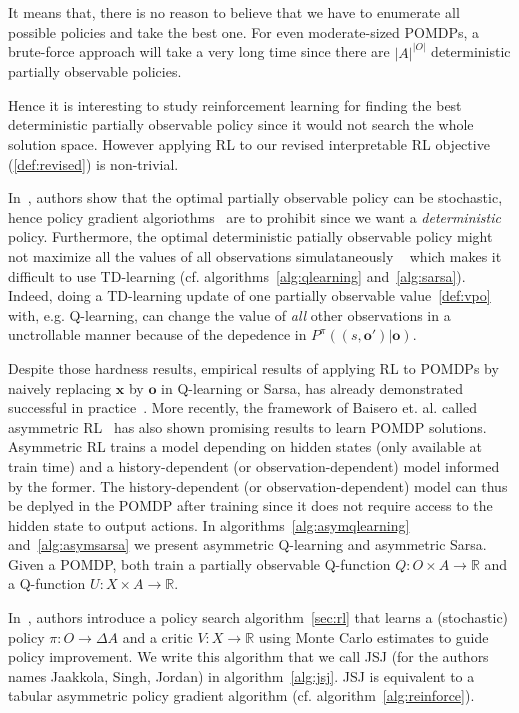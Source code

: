 It means that, there is no reason to believe that we have to enumerate all possible policies and take the best one. 
For even moderate-sized POMDPs, a brute-force approach will take a very long time since there are $|A|^{|O|}$ deterministic partially observable policies.

Hence it is interesting to study reinforcement learning for finding the best deterministic partially observable policy since it would not search the whole solution space.
However applying RL to our revised interpretable RL objective (\ref{def:revised}) is non-trivial.

In~\cite[Fact 2]{learning-pomdp}, authors show that the optimal partially observable policy can be stochastic, hence policy gradient algoriothms~\cite{pg_sutton} are to prohibit since we want a \textit{deterministic} policy. 
Furthermore, the optimal deterministic patially observable policy might not maximize all the values of all observations simulataneously ~\cite[Fact 5]{learning-pomdp} which makes it difficult to use TD-learning (cf. algorithms~\ref{alg:qlearning} and~\ref{alg:sarsa}).
Indeed, doing a TD-learning update of one partially observable value~\ref{def:vpo} with, e.g. Q-learning, can change the value of \textit{all} other observations in a unctrollable manner because of the depedence in $P^{\pi}((s, \boldsymbol{o}')|\boldsymbol{o})$.

Despite those hardness results, empirical results of applying RL to POMDPs by naively replacing $\boldsymbol{x}$ by $\boldsymbol{o}$ in Q-learning or Sarsa, has already demonstrated successful in practice~\cite{sarsa-pomdp}. 
More recently, the framework of Baisero et. al. called asymmetric RL~\cite{baisero-dqn,baisero-ppo} has also shown promising results to learn POMDP solutions.
Asymmetric RL trains a model depending on hidden states (only available at train time) and a history-dependent (or observation-dependent) model informed by the former.
The history-dependent (or observation-dependent) model can thus be deplyed in the POMDP after training since it does not require access to the hidden state to output actions.
In algorithms~\ref{alg:asymqlearning} and~\ref{alg:asymsarsa} we present asymmetric Q-learning and asymmetric Sarsa. Given a POMDP, both train a partially observable Q-function $Q:O\times A\rightarrow\mathbb{R}$ and a Q-function $U:X\times A\rightarrow\mathbb{R}$.

In~\cite{jsj}, authors introduce a policy search algorithm~\ref{sec:rl} that learns a (stochastic) policy $\pi:O\rightarrow\Delta A$ and a critic $V:X\rightarrow \mathbb{R}$ using Monte Carlo estimates to guide policy improvement.
We write this algorithm that we call JSJ (for the authors names Jaakkola, Singh, Jordan) in algorithm~\ref{alg:jsj}. JSJ is equivalent to a tabular asymmetric policy gradient algorithm (cf. algorithm~\ref{alg:reinforce}). 

